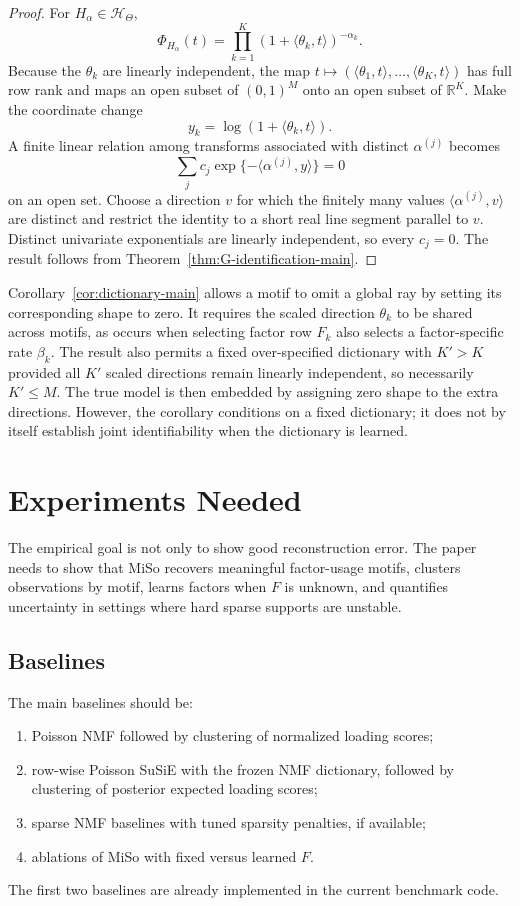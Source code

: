 \documentclass[11pt]{article}
\newcommand{\R}{\mathbb{R}}
\theoremstyle{plain}
\theoremstyle{definition}
\begin{document}
\begin{proof}
For $H_\alpha\in\mathcal H_\Theta$,
\[
  \Phi_{H_\alpha}(t)
  =\prod_{k=1}^{K}
    (1+\langle\theta_k,t\rangle)^{-\alpha_k}.
\]
Because the $\theta_k$ are linearly independent, the map
$t\mapsto(\langle\theta_1,t\rangle,\ldots,
\langle\theta_K,t\rangle)$ has full row rank and maps an open subset of
$(0,1)^M$ onto an open subset of $\R^K$.  Make the coordinate change
\[
  y_k=\log(1+\langle\theta_k,t\rangle).
\]
A finite linear relation among transforms associated with distinct
$\alpha^{(j)}$ becomes
\[
  \sum_jc_j\exp\{-\langle\alpha^{(j)},y\rangle\}=0
\]
on an open set.  Choose a direction $v$ for which the finitely many values
$\langle\alpha^{(j)},v\rangle$ are distinct and restrict the identity to a
short real line segment parallel to $v$.  Distinct univariate exponentials
are linearly independent, so every $c_j=0$.  The result follows from
Theorem~\ref{thm:G-identification-main}.
\end{proof}

Corollary~\ref{cor:dictionary-main} allows a motif to omit a global ray by
setting its corresponding shape to zero.  It requires the scaled direction
$\theta_k$ to be shared across motifs, as occurs when selecting factor row
$F_k$ also selects a factor-specific rate $\beta_k$.  The result also permits a
fixed over-specified dictionary with $K'>K$ provided all $K'$ scaled
directions remain linearly independent, so necessarily $K'\leq M$.  The true
model is then embedded by assigning zero shape to the extra directions.
However, the corollary conditions on a fixed dictionary; it does not by itself
establish joint identifiability when the dictionary is learned.

\section{Experiments Needed}
\label{sec:experiments}

The empirical goal is not only to show good reconstruction error. The paper
needs to show that MiSo recovers meaningful factor-usage motifs, clusters
observations by motif, learns factors when $F$ is unknown, and quantifies
uncertainty in settings where hard sparse supports are unstable.

\subsection{Baselines}

The main baselines should be:
\begin{enumerate}
  \item Poisson NMF followed by clustering of normalized loading scores;
  \item row-wise Poisson SuSiE with the frozen NMF dictionary, followed by
  clustering of posterior expected loading scores;
  \item sparse NMF baselines with tuned sparsity penalties, if available;
  \item ablations of MiSo with fixed versus learned $F$.
\end{enumerate}
The first two baselines are already implemented in the current benchmark code.
\end{document}
